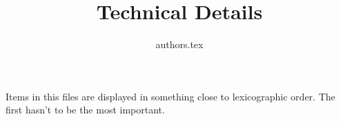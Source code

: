 \documentclass[12pt,onecolumn]{article}
\title{Technical Details}
\author{{authors.tex}}
\begin{document}
\maketitle

Items in this files are displayed in something close to lexicographic order. The first hasn't to be the most important.

\tableofcontents

\end{document}

